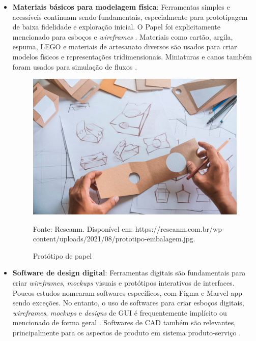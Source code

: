 \begin{itemize}
	\item \textbf{Materiais básicos para modelagem física}: Ferramentas simples e acessíveis continuam sendo fundamentais, especialmente para prototipagem de baixa fidelidade e exploração inicial. O Papel foi explicitamente mencionado para esboços e \textit{wireframes} \cite{villa2022integratedcare, asbjornsen2022echange, Suryawati2024}. Materiais como cartão, argila, espuma, LEGO \cite{wang2023smartproducts, lee2023industry} e materiais de artesanato diversos \cite{seko2024transitions} são usados para criar modelos físicos e representações tridimensionais. Miniaturas e canos também foram usados para simulação de fluxos \cite{lee2023industry}.
	
	\begin{figure}[H]
		\centering
		\includegraphics[width=0.75\linewidth]{figuras/prototipo-papel}
		\caption{Protótipo de papel}
		Fonte: Rescanm. Disponível em: https://rescanm.com.br/wp-content/uploads/2021/08/prototipo-embalagem.jpg. 
		\label{fig:ferramentas-prototipacao}
	\end{figure}
	
	\item \textbf{Software de design digital}: Ferramentas digitais são fundamentais para criar \textit{wireframes}, \textit{mockups} visuais e protótipos interativos de interfaces. Poucos estudos nomearam softwares específicos, com Figma \cite{villa2022integratedcare} e Marvel app \cite{asbjornsen2022echange} sendo exceções. No entanto, o uso de softwares para criar esboços digitais, \textit{wireframes}, \textit{mockups} e \textit{designs} de GUI é frequentemente implícito ou mencionado de forma geral \cite{wang2023smartproducts, hegemann2024palette, nguyen2022human, lee2023industry, milton2021eatingdisorders, Suryawati2024}. Softwares de CAD também são relevantes, principalmente para os aspectos de produto em sistema produto-serviço \cite{wang2023smartproducts, quintero2021interdisciplinary, paust2025integrative}.
	

\end{itemize}
